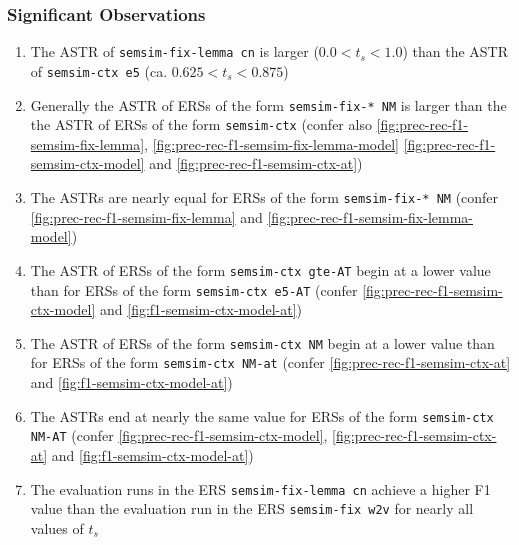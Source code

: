 \documentclass[11pt]{scrreprt}
\newcounter{listcounter}
\begin{document}
\subsubsection{Significant Observations}
\begin{enumerate}[label=\arabic{listcounter}.\arabic*]
	\item The ASTR of \texttt{semsim-fix-lemma cn} is larger (\(0.0 < t_s < 1.0\)) than the ASTR of \texttt{semsim-ctx e5} (ca. \(0.625 < t_s < 0.875\)) \label{obs-itm:ASTR-lemma-FNESS-cn-higher-than-CNESS-e5}
	\item Generally the ASTR of ERSs of the form \texttt{semsim-fix-* NM} is larger than the the ASTR of ERSs of the form \texttt{semsim-ctx} (confer also \cref{fig:prec-rec-f1-semsim-fix-lemma}, \cref{fig:prec-rec-f1-semsim-fix-lemma-model} \cref{fig:prec-rec-f1-semsim-ctx-model} and \cref{fig:prec-rec-f1-semsim-ctx-at}) \label{obs-itm:ASTR-FNESS-higher-than-CNESS}
	\item The ASTRs are nearly equal for ERSs of the form \texttt{semsim-fix-* NM} \label{obs-itm:ASTR-equal-FNESS} (confer \cref{fig:prec-rec-f1-semsim-fix-lemma} and \cref{fig:prec-rec-f1-semsim-fix-lemma-model}) \label{obs-itm:ASTR-FNESS-equal}
	\item The ASTR of ERSs of the form \texttt{semsim-ctx gte-AT} begin at a lower value than for ERSs of the form \texttt{semsim-ctx e5-AT} (confer \cref{fig:prec-rec-f1-semsim-ctx-model} and \cref{fig:f1-semsim-ctx-model-at}) \label{obs-itm:ASTR-CNESS-gte-starts-earlier}
	\item The ASTR of ERSs of the form \texttt{semsim-ctx NM} begin at a lower value than for ERSs of the form \texttt{semsim-ctx NM-at} (confer \cref{fig:prec-rec-f1-semsim-ctx-at} and \cref{fig:f1-semsim-ctx-model-at}) \label{obs-itm:ASTR-CNESS-at-starts-earlier}
	\item The ASTRs end at nearly the same value for ERSs of the form \texttt{semsim-ctx NM-AT} \label{obs-itm:ASTR-equal-FNESS} (confer \cref{fig:prec-rec-f1-semsim-ctx-model}, \cref{fig:prec-rec-f1-semsim-ctx-at} and \cref{fig:f1-semsim-ctx-model-at}) \label{obs-itm:ASTR-CNESS-end-equal}

	\item The evaluation runs in the ERS \texttt{semsim-fix-lemma cn} achieve a higher F1 value than the evaluation run in the ERS \texttt{semsim-fix w2v} for nearly all values of \(t_s\) \label{obs-itm:lemma-FNESS-higher-f1-nearly-always}


\end{enumerate}
\end{document}
